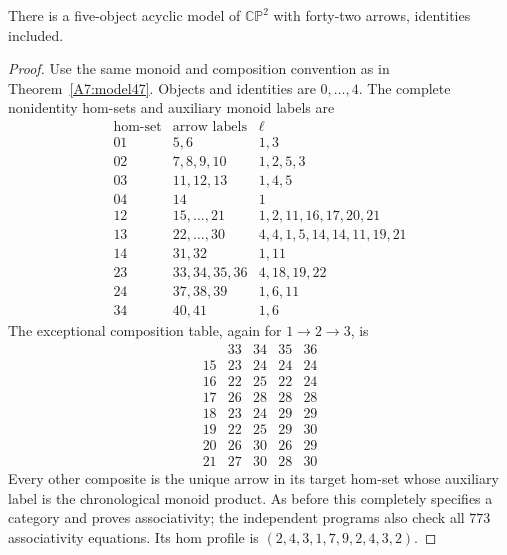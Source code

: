 \begin{theorem}[Proved]\label{A7:model42}
There is a five-object acyclic model of $\mathbb{CP}^2$ with
forty-two arrows, identities included.
\end{theorem}
\begin{proof}
Use the same monoid and composition convention as in
Theorem~\ref{A7:model47}. Objects and identities are $0,\ldots,4$.
The complete nonidentity hom-sets and auxiliary monoid labels are
\[
\begin{array}{c|c|l}
\text{hom-set}&\text{arrow labels}&\ell\\\hline
01&5,6&1,3\\
02&7,8,9,10&1,2,5,3\\
03&11,12,13&1,4,5\\
04&14&1\\
12&15,\ldots,21&1,2,11,16,17,20,21\\
13&22,\ldots,30&4,4,1,5,14,14,11,19,21\\
14&31,32&1,11\\
23&33,34,35,36&4,18,19,22\\
24&37,38,39&1,6,11\\
34&40,41&1,6
\end{array}
\]
The exceptional composition table, again for $1\to2\to3$, is
\[
\begin{array}{c|rrrr}
&33&34&35&36\\\hline
15&23&24&24&24\\
16&22&25&22&24\\
17&26&28&28&28\\
18&23&24&29&29\\
19&22&25&29&30\\
20&26&30&26&29\\
21&27&30&28&30
\end{array}
\]
Every other composite is the unique arrow in its target hom-set
whose auxiliary label is the chronological monoid product.
As before this completely specifies a category and proves
associativity; the independent programs also check all $773$
associativity equations. Its hom profile is
$(2,4,3,1,7,9,2,4,3,2)$.


\end{proof}
